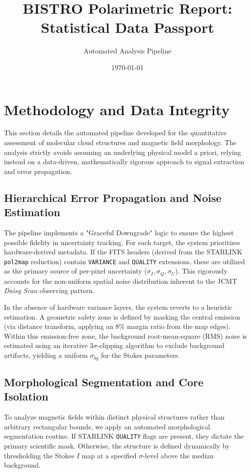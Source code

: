 \documentclass[10pt, a4paper]{article}
\title{BISTRO Polarimetric Report: Statistical Data Passport}
\author{Automated Analysis Pipeline}
\date{\today}
\begin{document}
\maketitle

\section*{Methodology and Data Integrity}
This section details the automated pipeline developed for the quantitative assessment of molecular cloud structures and magnetic field morphology. The analysis strictly avoids assuming an underlying physical model a priori, relying instead on a data-driven, mathematically rigorous approach to signal extraction and error propagation.

\subsection*{Hierarchical Error Propagation and Noise Estimation}
The pipeline implements a "Graceful Downgrade" logic to ensure the highest possible fidelity in uncertainty tracking. For each target, the system prioritizes hardware-derived metadata. If the FITS headers (derived from the STARLINK \texttt{pol2map} reduction) contain \texttt{VARIANCE} and \texttt{QUALITY} extensions, these are utilized as the primary source of per-pixel uncertainty ($\sigma_I, \sigma_Q, \sigma_U$). This rigorously accounts for the non-uniform spatial noise distribution inherent to the JCMT \textit{Daisy Scan} observing pattern.

In the absence of hardware variance layers, the system reverts to a heuristic estimation. A geometric safety zone is defined by masking the central emission (via distance transform, applying an $8\%$ margin ratio from the map edges). Within this emission-free zone, the background root-mean-square (RMS) noise is estimated using an iterative $3\sigma$-clipping algorithm to exclude background artifacts, yielding a uniform $\sigma_{bg}$ for the Stokes parameters.

\subsection*{Morphological Segmentation and Core Isolation}
To analyze magnetic fields within distinct physical structures rather than arbitrary rectangular bounds, we apply an automated morphological segmentation routine. 
If STARLINK \texttt{QUALITY} flags are present, they dictate the primary scientific mask. Otherwise, the structure is defined dynamically by thresholding the Stokes $I$ map at a specified $\sigma$-level above the median background. 
\end{document}
